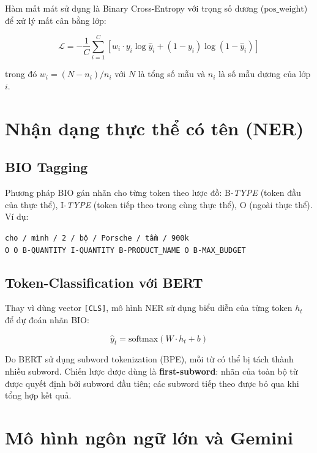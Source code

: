 \documentclass[12pt, a4paper]{report}
\begin{document}
Hàm mất mát sử dụng là Binary Cross-Entropy với trọng số dương
($\text{pos\_weight}$) để xử lý mất cân bằng lớp:

\begin{equation}
  \mathcal{L} = -\frac{1}{C}\sum_{i=1}^{C}
  \left[ w_i \cdot y_i \log\hat{y}_i + (1 - y_i)\log(1-\hat{y}_i) \right]
\end{equation}

trong đó $w_i = (N - n_i) / n_i$ với $N$ là tổng số mẫu
và $n_i$ là số mẫu dương của lớp $i$.

\section{Nhận dạng thực thể có tên (NER)}

\subsection{BIO Tagging}

Phương pháp BIO gán nhãn cho từng token theo lược đồ:
B-\textit{TYPE} (token đầu của thực thể), I-\textit{TYPE}
(token tiếp theo trong cùng thực thể), O (ngoài thực thể).
Ví dụ:

\begin{center}
\texttt{cho / mình / 2 / bộ / Porsche / tầm / 900k}\\
\texttt{O \quad O \quad B-QUANTITY \quad I-QUANTITY \quad B-PRODUCT\_NAME \quad O \quad B-MAX\_BUDGET}
\end{center}

\subsection{Token-Classification với BERT}

Thay vì dùng vector \texttt{[CLS]}, mô hình NER sử dụng biểu diễn
của từng token $h_t$ để dự đoán nhãn BIO:

\begin{equation}
  \hat{y}_t = \text{softmax}(W \cdot h_t + b)
\end{equation}

Do BERT sử dụng subword tokenization (BPE), mỗi từ có thể bị tách
thành nhiều subword. Chiến lược được dùng là \textbf{first-subword}:
nhãn của toàn bộ từ được quyết định bởi subword đầu tiên;
các subword tiếp theo được bỏ qua khi tổng hợp kết quả.

\section{Mô hình ngôn ngữ lớn và Gemini}
\end{document}

